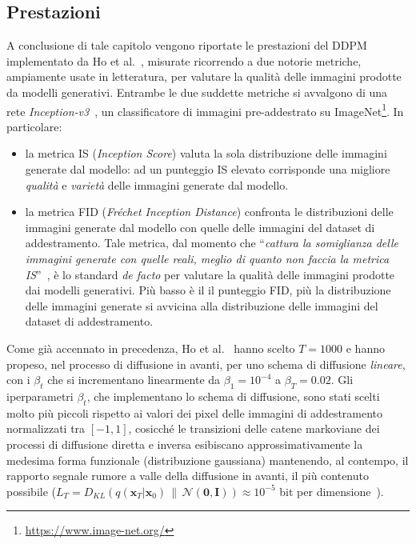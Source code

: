 \subsection{Prestazioni}

A conclusione di tale capitolo vengono riportate le prestazioni del DDPM implementato da Ho et al.~\cite{ho2020},
misurate ricorrendo a due notorie metriche, ampiamente usate in letteratura, per valutare la qualità delle immagini prodotte da modelli generativi. 
Entrambe le due suddette metriche si avvalgono di una rete \emph{Inception-v3}~\cite{szegedyRethinkingInceptionArchitecture2015}, 
un classificatore di immagini pre-addestrato su ImageNet\footnote{\url{https://www.image-net.org/}}. In particolare:
\begin{itemize}
\item la metrica IS (\emph{Inception Score}) valuta la sola distribuzione delle immagini generate dal modello: 
ad un punteggio IS elevato corrisponde una migliore \emph{qualità} e \emph{varietà} delle immagini generate dal modello. 
\item la metrica FID (\emph{Fréchet Inception Distance}) confronta le distribuzioni delle immagini generate dal modello con quelle 
delle immagini del dataset di addestramento. Tale metrica, dal momento che “\emph{cattura la somiglianza delle immagini generate con quelle reali, 
meglio di quanto non faccia la metrica IS}”~\cite{heuselGANsTrainedTwo2017}, è lo standard \emph{de facto} per valutare la qualità delle immagini prodotte dai modelli generativi. 
Più basso è il il punteggio FID, più la distribuzione delle immagini generate si avvicina alla distribuzione delle immagini del dataset di addestramento.
\end{itemize}

\noindent Come già accennato in precedenza, Ho et al.~\cite{ho2020} hanno scelto $T=1000$ e hanno propeso, nel processo di diffusione in avanti, 
per uno schema di diffusione \emph{lineare}, con i $\beta_t$ che si incrementano linearmente da $\beta_1 = 10^{-4}$ a $\beta_T=0.02$. 
Gli iperparametri $\beta_t$, che implementano lo schema di diffusione, sono stati scelti molto più piccoli rispetto ai valori dei pixel delle immagini
di addestramento normalizzati tra $[-1, 1]$, cosicché le transizioni delle catene markoviane dei processi di diffusione diretta e inversa 
esibiscano approssimativamente la medesima forma funzionale (distribuzione gaussiana)
mantenendo, al contempo, il rapporto segnale rumore a valle della diffusione in avanti, il più contenuto possibile
($L_T=D_{KL}(q(\mathbf{x}_T|\mathbf{x}_0)\,\|\,\mathcal{N}(\bm{0},\bm{I})) \approx 10^{-5}$ bit per dimensione~\cite{ho2020}).

